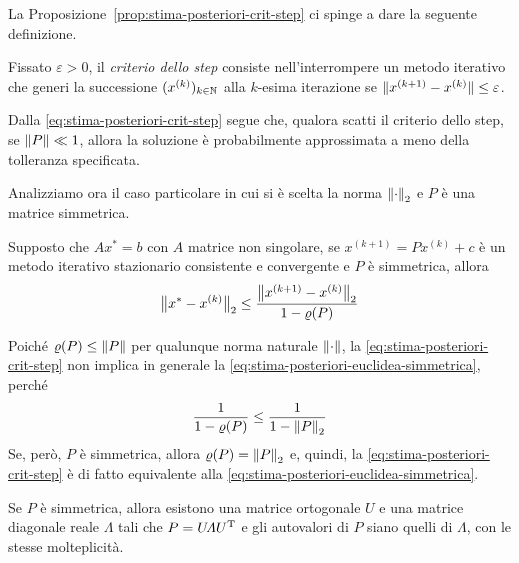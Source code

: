 	La Proposizione~\ref{prop:stima-posteriori-crit-step} ci spinge a dare la seguente definizione.
	
	\begin{definizione}
		Fissato \(\varepsilon > 0\), il \emph{criterio dello step} consiste nell'interrompere un metodo iterativo che generi la successione \((x^{(k)})_{k \in \mathbb{N}}\) alla \(k\)-esima iterazione se \(\norm*{x^{(k + 1)} - x^{(k)}} \! \le \varepsilon\).
	\end{definizione}

	Dalla \eqref{eq:stima-posteriori-crit-step} segue che, qualora scatti il criterio dello step, se \(\norm{P} \ll 1\), allora la soluzione è probabilmente approssimata a meno della tolleranza specificata.
	
	Analizziamo ora il caso particolare in cui si è scelta la norma \(\norm{\cdot}_2\) e \(P\) è una matrice simmetrica.
	
	\begin{teorema}
		Supposto che \(A x^* = b\) con \(A\) matrice non singolare, se \(x^{(k + 1)} = P x^{(k)} + c\) è un metodo iterativo stazionario consistente e convergente e \(P\) è simmetrica, allora
		\begin{equation}\label{eq:stima-posteriori-euclidea-simmetrica}
			\bigl\| x^* - x^{(k)} \bigr\|_2 \le \frac{\bigl\| x^{(k + 1)} - x^{(k)} \bigr\|_2}{1 - \operatorname{\varrho} (P)}
		\end{equation}
	\end{teorema}

	\begin{osservazione}
		Poiché \(\operatorname{\varrho} (P) \le \norm{P}\) per qualunque norma naturale \(\norm{\cdot}\), la \eqref{eq:stima-posteriori-crit-step} non implica in generale la \eqref{eq:stima-posteriori-euclidea-simmetrica}, perché
		\begin{equation*}
			\frac{1}{1 - \operatorname{\varrho} (P)} \le \frac{1}{1 - \norm{P}_2}
		\end{equation*}
		Se, però, \(P\) è simmetrica, allora \(\operatorname{\varrho} (P) = \norm{P}_2\) e, quindi, la \eqref{eq:stima-posteriori-crit-step} è di fatto equivalente alla \eqref{eq:stima-posteriori-euclidea-simmetrica}.
	\end{osservazione}

	\begin{lemma}
		Se \(P\) è simmetrica, allora esistono una matrice ortogonale \(U \!\) e una matrice diagonale reale \(\varLambda\) tali che \(P = U \! \varLambda U^\mathrm{T}\relax\) e gli autovalori di \(P\) siano quelli di \(\varLambda\), con le stesse molteplicità.
	\end{lemma}

